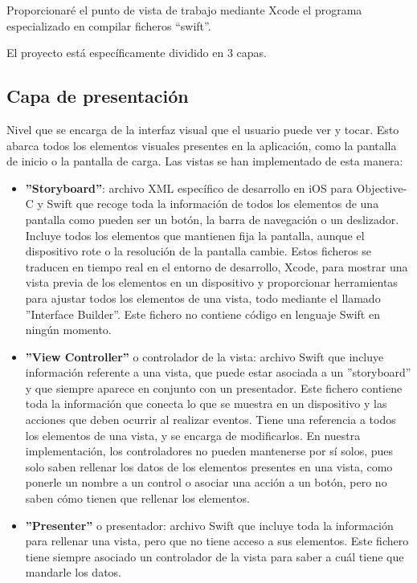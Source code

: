 Proporcionaré el punto de vista de trabajo mediante Xcode el programa especializado en compilar ficheros “swift”.

El proyecto está específicamente dividido en 3 capas.

\subsection{Capa de presentación}
Nivel que se encarga de la interfaz visual que el usuario puede ver y tocar. Esto abarca todos los elementos visuales presentes en la aplicación, como la pantalla de inicio o la pantalla de carga. 
Las vistas se han implementado de esta manera:

\begin{itemize}
	\item \textbf{''Storyboard''}: archivo XML específico de desarrollo en iOS para Objective-C y Swift que recoge toda la información de todos los elementos de una pantalla como pueden ser un botón, la barra de navegación o un deslizador. 
	Incluye todos los elementos que mantienen fija la pantalla, aunque el dispositivo rote o la resolución de la pantalla cambie.
	Estos ficheros se traducen en tiempo real en el entorno de desarrollo, Xcode, para mostrar una vista previa de los elementos en un dispositivo y proporcionar herramientas para ajustar todos los elementos de una vista, todo mediante el llamado ''Interface Builder''.
Este fichero no contiene código en lenguaje Swift en ningún momento.
	\item \textbf{''View Controller''} o controlador de la vista: archivo Swift que incluye información referente a una vista, que puede estar asociada a un ''storyboard'' y que siempre aparece en conjunto con un presentador.
	Este fichero contiene toda la información que conecta lo que se muestra en un dispositivo y las acciones que deben ocurrir al realizar eventos. Tiene una referencia a todos los elementos de una vista, y se encarga de modificarlos.
	En nuestra implementación, los controladores no pueden mantenerse por sí solos, pues solo saben rellenar los datos de los elementos presentes en una vista, como ponerle un nombre a un control o asociar una acción a un botón, pero no saben cómo tienen que rellenar los elementos.
	\item \textbf{''Presenter''} o presentador: archivo Swift que incluye toda la información para rellenar una vista, pero que no tiene acceso a sus elementos. Este fichero tiene siempre asociado un controlador de la vista para saber a cuál tiene que mandarle los datos.

\end{itemize}

